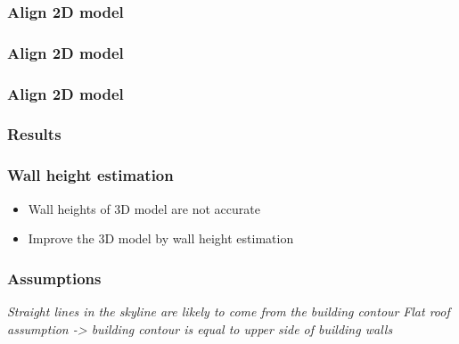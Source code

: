 \documentclass{beamer}
\begin{document}
\frame
{
	\frametitle{Align 2D model}
}


\frame
{
	\frametitle{Align 2D model}
}


\frame
{
	\frametitle{Align 2D model}
}

\frame
{
	\frametitle{Results}
}

\frame
{
	\frametitle{Wall height estimation}
	\begin{itemize}
	\item  <+-| alert@+> Wall heights of 3D model are not accurate
	\item  <+-| alert@+> Improve the 3D model by wall height estimation
	\end{itemize}
}

\frame
{
	\frametitle{Assumptions}
	\emph{Straight lines in the skyline are likely to come from the building contour}
	\emph{Flat roof assumption -> building contour is equal to upper side of building walls}
}
\end{document}
